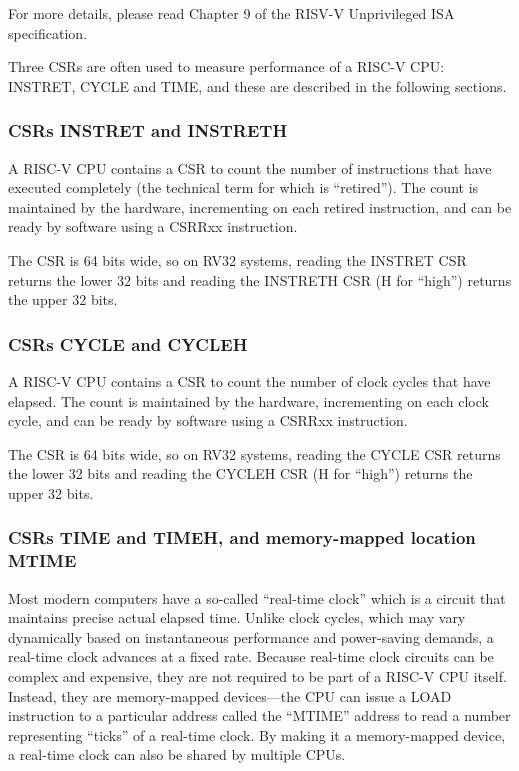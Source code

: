 For more details, please read Chapter 9 of the RISV-V Unprivileged ISA
specification.

Three CSRs are often used to measure performance of a RISC-V CPU:
INSTRET, CYCLE and TIME, and these are described in the following
sections.


\subsubsection{CSRs INSTRET and INSTRETH}

\label{Sec_CSRs_INSTRET}

A RISC-V CPU contains a CSR to count the number of instructions that
have executed completely (the technical term for which is
``retired'').  The count is maintained by the hardware, incrementing
on each retired instruction, and can be ready by software using a
CSRRxx instruction.

The CSR is 64 bits wide, so on RV32 systems, reading the INSTRET CSR
returns the lower 32 bits and reading the INSTRETH CSR (H for
``high'') returns the upper 32 bits.


\subsubsection{CSRs CYCLE and CYCLEH}

\label{Sec_CSRs_CYCLE}

A RISC-V CPU contains a CSR to count the number of clock cycles that
have elapsed.  The count is maintained by the hardware, incrementing
on each clock cycle, and can be ready by software using a CSRRxx
instruction.

The CSR is 64 bits wide, so on RV32 systems, reading the CYCLE CSR
returns the lower 32 bits and reading the CYCLEH CSR (H for ``high'')
returns the upper 32 bits.


\subsubsection{CSRs TIME and TIMEH, and memory-mapped location MTIME}

\label{Sec_CSRs_TIME}

Most modern computers have a so-called ``real-time clock'' which is a
circuit that maintains precise actual elapsed time.  Unlike clock
cycles, which may vary dynamically based on instantaneous performance
and power-saving demands, a real-time clock advances at a fixed rate.
Because real-time clock circuits can be complex and expensive, they
are not required to be part of a RISC-V CPU itself.  Instead, they are
memory-mapped devices---the CPU can issue a LOAD instruction to a
particular address called the ``MTIME'' address to read a number
representing ``ticks'' of a real-time clock.  By making it a
memory-mapped device, a real-time clock can also be shared by multiple
CPUs.

